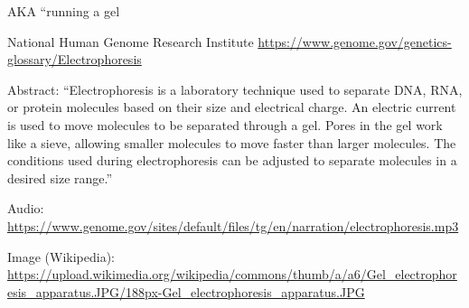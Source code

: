 \documentclass[
]{book}
\begin{document}
AKA ``running a gel

National Human Genome Research Institute
\url{https://www.genome.gov/genetics-glossary/Electrophoresis}

Abstract: ``Electrophoresis is a laboratory technique used to separate DNA, RNA, or protein molecules based on their size and electrical charge. An electric current is used to move molecules to be separated through a gel. Pores in the gel work like a sieve, allowing smaller molecules to move faster than larger molecules. The conditions used during electrophoresis can be adjusted to separate molecules in a desired size range.''

Audio: \url{https://www.genome.gov/sites/default/files/tg/en/narration/electrophoresis.mp3}

Image (Wikipedia): \url{https://upload.wikimedia.org/wikipedia/commons/thumb/a/a6/Gel_electrophoresis_apparatus.JPG/188px-Gel_electrophoresis_apparatus.JPG}
\end{document}
